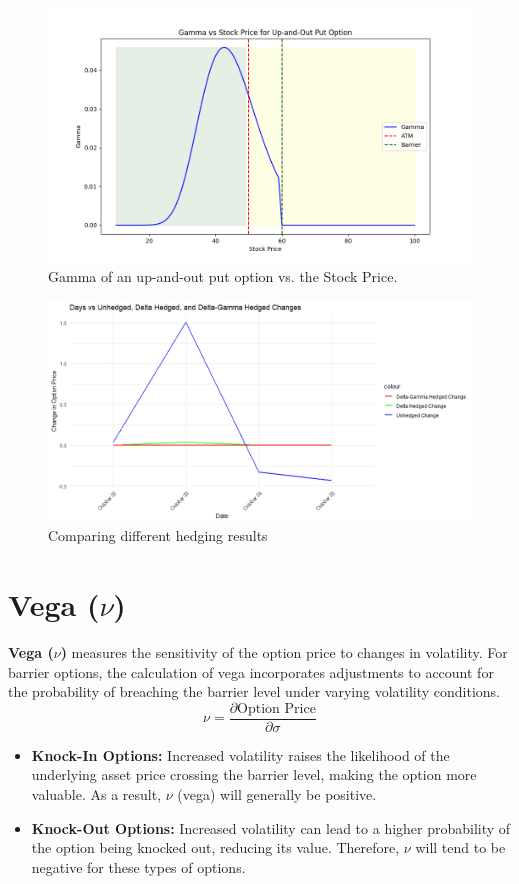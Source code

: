 \begin{figure}[h]
    \centering
    \includegraphics[width=.65\linewidth]{content/images/gamma.png}
    \caption{Gamma of an up-and-out put option vs. the Stock Price.}
    \label{fig:gamma_behavior}
\end{figure}

\begin{figure}[h]
    \centering
    \includegraphics[width=.65\linewidth]{content/images/compare_hedging.png}
    \caption{Comparing different hedging results}
    \label{fig:compare_deltagamma_hedge}
\end{figure}


\section{Vega (\(\nu\))}

\textbf{Vega (\(\nu\))} measures the sensitivity of the option price to changes in volatility. For barrier options, the calculation of vega incorporates adjustments to account for the probability of breaching the barrier level under varying volatility conditions.
\[
\nu = \frac{\partial \text{Option Price}}{\partial \sigma}
\]

\begin{itemize}
    \item \textbf{Knock-In Options:} Increased volatility raises the likelihood of the underlying asset price crossing the barrier level, making the option more valuable. As a result, \(\nu\) (vega) will generally be positive.
    \item \textbf{Knock-Out Options:} Increased volatility can lead to a higher probability of the option being knocked out, reducing its value. Therefore, \(\nu\) will tend to be negative for these types of options.
\end{itemize}

